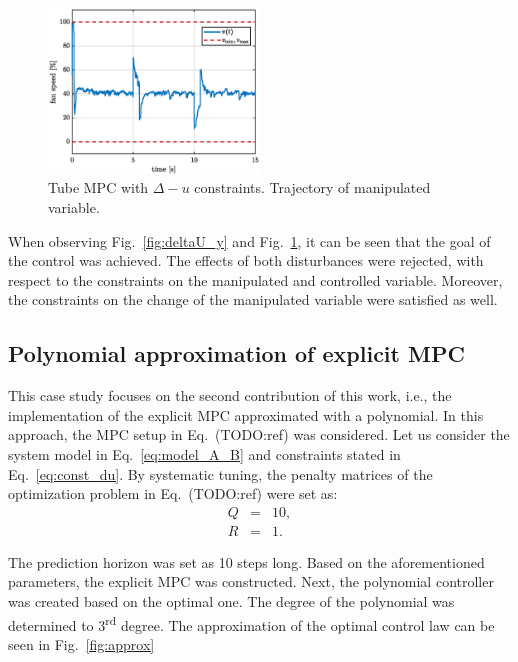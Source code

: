 \documentclass[letterpaper, 10 pt, conference]{ieeeconf}
\begin{document}
\begin{figure}
	\begin{center}
		\includegraphics[width=0.5\textwidth]{images/deltaU_v_new.eps}
		\caption{Tube MPC with $\Delta - u$ constraints. Trajectory of manipulated variable.}
		\label{fig:deltaU_u}
	\end{center}
\end{figure}

When observing Fig.~\ref{fig:deltaU_y} and Fig.~\ref{fig:deltaU_u}, it can be seen that the goal of the control was achieved. The effects of both disturbances were rejected, with respect to the constraints on the manipulated and controlled variable. Moreover, the constraints on the change of the manipulated variable were satisfied as well.

\subsection{Polynomial approximation of explicit MPC}
\label{sec:polynomial_exp}
This case study focuses on the second contribution of this work, i.e., the implementation of the explicit MPC approximated with a polynomial. In this approach, the MPC setup in Eq.~(TODO:ref) was considered. Let us consider the system model in Eq.~\eqref{eq:model_A_B} and constraints stated in Eq.~\eqref{eq:const_du}. By systematic tuning, the penalty matrices of the optimization problem in Eq.~(TODO:ref) were set as:
\begin{subequations}
	\label{eq:setup_penalty_pol} 
	\begin{eqnarray}
		\label{eq:setup_Q_pol}
		Q &=& 10, \\
		\label{eq:setup_R_pol}
		R &=& 1.
	\end{eqnarray}
\end{subequations}

The prediction horizon was set as 10 steps long. Based on the aforementioned parameters, the explicit MPC was constructed. Next, the polynomial controller was created based on the optimal one. The degree of the polynomial was determined to 3\textsuperscript{rd} degree. The approximation of the optimal control law can be seen in Fig.~\ref{fig:approx}
 
\end{document}
